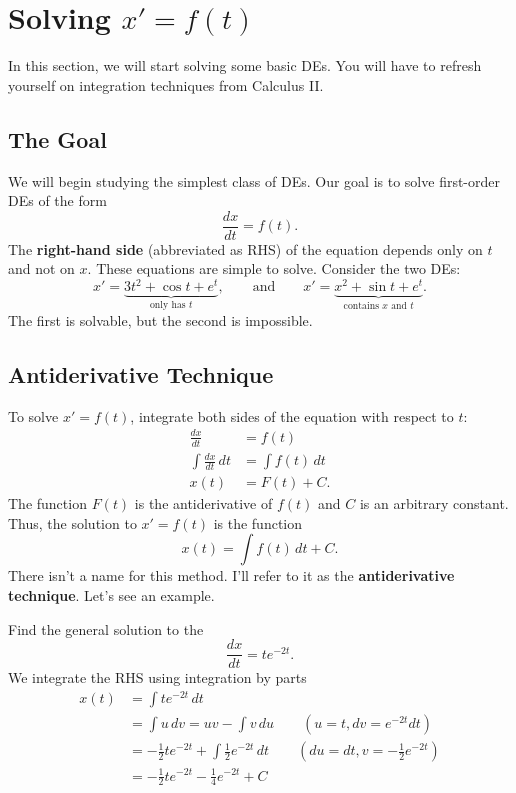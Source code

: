 \documentclass[letterpaper]{article}
\begin{document}
\section{Solving $x'=f(t)$}

In this section, we will start solving some basic DEs. You will have to refresh yourself on integration techniques from Calculus II.

\subsection{The Goal}
We will begin studying the simplest class of DEs.
Our goal is to solve first-order DEs of the form
\[
\frac{dx}{dt} = f(t).
\]
The \textbf{right-hand side} (abbreviated as RHS) of the equation depends only on $t$ and not on $x$. These equations are simple to solve. Consider the two DEs:
\[
x' = \underbrace{3t^2+\cos t+e^t}_{\text{only has }t}, 
\qquad \text{and}\qquad
x' = \underbrace{x^2+\sin t+e^t}_{\text{contains } x\text{ and }t}.
\]
The first is solvable, but the second is impossible.

\subsection{Antiderivative Technique}
To solve $x'=f(t)$, integrate both sides of the equation with respect to $t$:
\begin{align*}
    \frac{dx}{dt} &= f(t)\\
    \int\frac{dx}{dt} \,dt&= \int f(t) \,dt \\
    x(t)&= F(t) +C.
\end{align*}
The function $F(t)$ is the antiderivative of $f(t)$ and $C$ is an arbitrary constant.
Thus, the solution to $x'=f(t)$ is the function
\[
x(t) = \int f(t)\,dt + C.
\]
There isn't a name for this method. I'll refer to it as the \textbf{antiderivative technique}. Let's see an example.

\begin{example}[2]{
Find the general solution to the 
\[
\frac{dx}{dt} = t e^{-2t}.
\]
}
We integrate the RHS using integration by parts 
\begin{align*}    
x(t) &= \int t e^{-2t}\,dt\\ 
    &=\int u\,dv = uv - \int v\,du \qquad (u=t,dv =e^{-2t}dt)\\
    &=-\tfrac12 t e^{-2t} + \int\tfrac12 e^{-2t}\,dt \qquad (du=dt,v =-\tfrac{1}{2}e^{-2t})\\
    &=\boxed{-\tfrac12 t e^{-2t} - \tfrac14 e^{-2t} + C} 
\end{align*}
\end{example}
\end{document}
